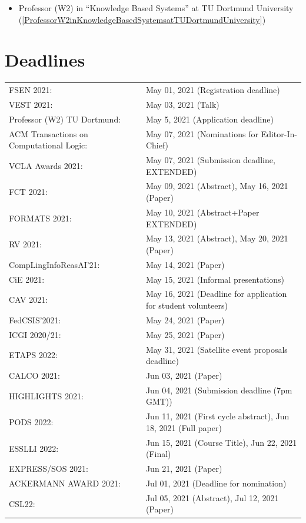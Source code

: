 \documentclass[prodmode,acmtecs]{acmsmall} %
\begin{document}
\begin{itemize}
\begin{itemize}\item Professor (W2) in “Knowledge Based Systems” at TU Dortmund University (\cref{ProfessorW2inKnowledgeBasedSystemsatTUDortmundUniversity})
\end{itemize} 
\end{itemize}\section{Deadlines}\label{deadlines}\begin{tabulary}{\linewidth}{LL}FSEN 2021:  & May 01, 2021 (Registration deadline) \\
VEST 2021:  & May 03, 2021 (Talk) \\
Professor (W2) TU Dortmund:  & May 5, 2021 (Application deadline) \\
ACM Transactions on Computational Logic:  & May 07, 2021 (Nominations for Editor-In-Chief) \\
VCLA Awards 2021:  & May 07, 2021 (Submission deadline, EXTENDED) \\
FCT 2021:  & May 09, 2021 (Abstract), May 16, 2021 (Paper) \\
FORMATS 2021:  & May 10, 2021 (Abstract+Paper EXTENDED) \\
RV 2021:  & May 13, 2021 (Abstract), May 20, 2021 (Paper) \\
CompLingInfoReasAI'21:  & May 14, 2021 (Paper) \\
CiE 2021:  & May 15, 2021 (Informal presentations) \\
CAV 2021:  & May 16, 2021 (Deadline for application for student volunteers) \\
FedCSIS’2021:  & May 24, 2021 (Paper) \\
ICGI 2020/21:  & May 25, 2021 (Paper) \\
ETAPS 2022:  & May 31, 2021 (Satellite event proposals deadline) \\
CALCO 2021:  & Jun 03, 2021 (Paper) \\
HIGHLIGHTS 2021:  & Jun 04, 2021 (Submission deadline (7pm GMT)) \\
PODS 2022:  & Jun 11, 2021 (First cycle abstract), Jun 18, 2021 (Full paper) \\
ESSLLI 2022:  & Jun 15, 2021 (Course Title), Jun 22, 2021 (Final) \\
EXPRESS/SOS 2021:  & Jun 21, 2021 (Paper) \\
ACKERMANN AWARD 2021:  & Jul 01, 2021 (Deadline for nomination) \\
CSL22:  & Jul 05, 2021 (Abstract), Jul 12, 2021 (Paper) \\
\end{tabulary}
\end{document}
